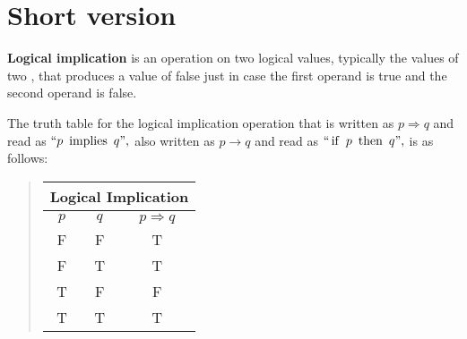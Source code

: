 \documentclass[12pt]{article}
\begin{document}

\section{Short version}

\textbf{Logical implication} is an operation on two logical values, typically the values of two , that produces a value of false just in case the first operand is true and the second operand is false.

The truth table for the logical implication operation that is written as $p \Rightarrow q$ and read as $``p\ \operatorname{implies}\ q",$ also written as $p \rightarrow q$ and read as $``\operatorname{if}\ p\ \operatorname{then}\ q",$ is as follows:

\begin{quote}\begin{tabular}{|c|c|c|}
\multicolumn{3}{c}{Logical Implication} \\
\hline
$p$ & $q$ & $p \Rightarrow q$ \\
\hline\hline
F & F & T \\
F & T & T \\
T & F & F \\
T & T & T \\
\hline
\end{tabular}\end{quote}
\end{document}
